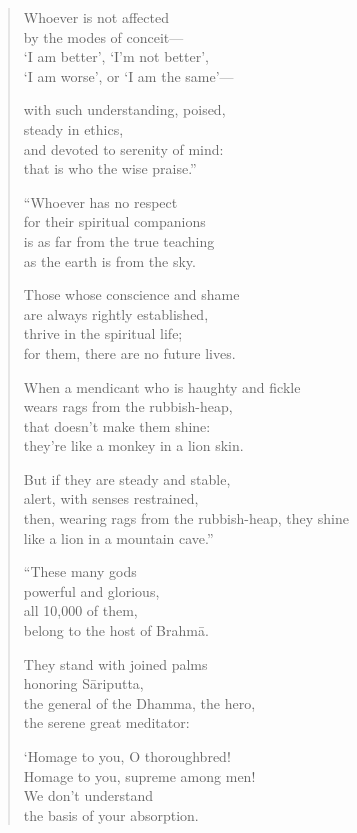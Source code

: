 \documentclass[12pt,openany]{book}%
\begin{document}
\begin{verse}
Whoever is not affected \\
by the modes of conceit—\\
‘I am better’, ‘I’m not better’, \\
‘I am worse’, or ‘I am the same’—

with such understanding, poised, \\
steady in ethics, \\
and devoted to serenity of mind: \\
that is who the wise praise.” 

“Whoever has no respect \\
for their spiritual companions \\
is as far from the true teaching \\
as the earth is from the sky. 

Those whose conscience and shame \\
are always rightly established, \\
thrive in the spiritual life; \\
for them, there are no future lives. 

When a mendicant who is haughty and fickle \\
wears rags from the rubbish-heap, \\
that doesn’t make them shine: \\
they’re like a monkey in a lion skin. 

But if they are steady and stable, \\
alert, with senses restrained, \\
then, wearing rags from the rubbish-heap, they shine \\
like a lion in a mountain cave.” 

“These many gods \\
powerful and glorious, \\
all 10,000 of them, \\
belong to the host of \textsanskrit{Brahmā}. 

They stand with joined palms \\
honoring \textsanskrit{Sāriputta}, \\
the general of the Dhamma, the hero, \\
the serene great meditator: 

‘Homage to you, O thoroughbred! \\
Homage to you, supreme among men! \\
We don’t understand \\
the basis of your absorption. 


\end{verse}
\end{document}
